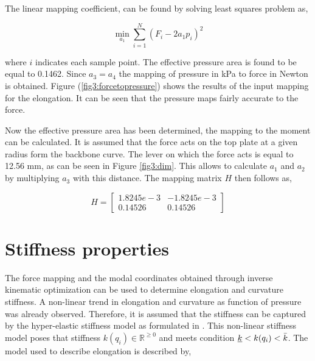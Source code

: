 The linear mapping coefficient, can be found by solving least squares problem as,

\begin{equation}
\min_{a_1} \sum_{i=1}^{N} (F_i - 2 a_1 p_i)^2
\label{eq3:forcefitting}
\end{equation}

where $i$ indicates each sample point. The effective pressure area is found to be equal to 0.1462. Since $a_3 = a_4$ the mapping of pressure in kPa to force in Newton is obtained. Figure (\ref{fig3:forcetopressure}) shows the results of the input mapping for the elongation. It can be seen that the pressure maps fairly accurate to the force.

Now the effective pressure area has been determined, the mapping to the moment can be calculated. It is assumed that the force acts on the top plate at a given radius form the backbone curve. The lever on which the force acts is equal to 12.56 mm, as can be seen in Figure \ref{fig3:dim}. This allows to calculate $a_1$ and $a_2$ by multiplying $a_3$ with this distance. The mapping matrix $H$ then follows as,

\begin{equation}
    H =  \begin{bmatrix} 1.8245e-3 & -1.8245e-3 \\
    0.14526 & 0.14526\end{bmatrix}  
\end{equation}





\section{Stiffness properties}

The force mapping and the modal coordinates obtained through inverse kinematic optimization can be used to determine elongation and curvature stiffness. A non-linear trend in elongation and curvature as function of pressure was already observed. Therefore, it is assumed that the stiffness can be captured by the hyper-elastic stiffness model as formulated in \cite{Caasenbrood2020StiffnessModel}. This non-linear stiffness model poses that stiffness $k(q_i) \in \mathbb{R}^{\geq 0}$ and meets condition $\underbar{$k$} < k(q_i) < \Bar{k}$. The model used to describe elongation is described by,


